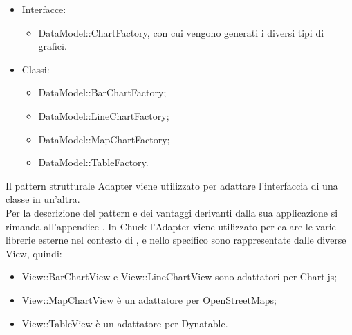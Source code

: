 	\begin{itemize}
	\item Interfacce:
		\begin{itemize}
			\item DataModel::ChartFactory, con cui vengono generati i diversi tipi di grafici.
		\end{itemize}
	\item Classi:
		\begin{itemize}
			\item DataModel::BarChartFactory;
			\item DataModel::LineChartFactory;
			\item DataModel::MapChartFactory;
			\item DataModel::TableFactory.
		\end{itemize}
	\end{itemize}
	Il pattern strutturale Adapter viene utilizzato per adattare l'interfaccia di una classe in un'altra.\\
	Per la descrizione del pattern e dei vantaggi derivanti dalla sua applicazione si rimanda all'appendice .
	In Chuck l'Adapter viene utilizzato per calare le varie librerie esterne nel contesto di \projectname{}, e nello specifico sono rappresentate dalle diverse View, quindi:
	\begin{itemize}
	\item View::BarChartView e View::LineChartView sono adattatori per Chart.js;
	\item View::MapChartView è un adattatore per OpenStreetMaps;
	\item View::TableView è un adattatore per Dynatable.
	\end{itemize}
	
